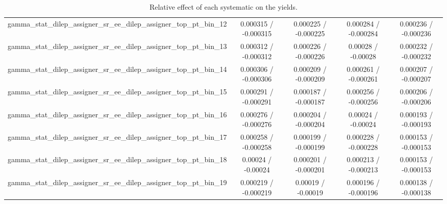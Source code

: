 \documentclass[10pt]{article}
\begin{document}
\begin{table}[htbp]
\begin{center}
\begin{tabular}{|c|c|c|c|c|}
  gamma_stat_dilep_assigner_sr_ee_dilep_assigner_top_pt_bin_12 & 0.000315 / -0.000315 & 0.000225 / -0.000225 & 0.000284 / -0.000284 & 0.000236 / -0.000236 \\ 
  gamma_stat_dilep_assigner_sr_ee_dilep_assigner_top_pt_bin_13 & 0.000312 / -0.000312 & 0.000226 / -0.000226 & 0.00028 / -0.00028 & 0.000232 / -0.000232 \\ 
  gamma_stat_dilep_assigner_sr_ee_dilep_assigner_top_pt_bin_14 & 0.000306 / -0.000306 & 0.000209 / -0.000209 & 0.000261 / -0.000261 & 0.000207 / -0.000207 \\ 
  gamma_stat_dilep_assigner_sr_ee_dilep_assigner_top_pt_bin_15 & 0.000291 / -0.000291 & 0.000187 / -0.000187 & 0.000256 / -0.000256 & 0.000206 / -0.000206 \\ 
  gamma_stat_dilep_assigner_sr_ee_dilep_assigner_top_pt_bin_16 & 0.000276 / -0.000276 & 0.000204 / -0.000204 & 0.00024 / -0.00024 & 0.000193 / -0.000193 \\ 
  gamma_stat_dilep_assigner_sr_ee_dilep_assigner_top_pt_bin_17 & 0.000258 / -0.000258 & 0.000199 / -0.000199 & 0.000228 / -0.000228 & 0.000153 / -0.000153 \\ 
  gamma_stat_dilep_assigner_sr_ee_dilep_assigner_top_pt_bin_18 & 0.00024 / -0.00024 & 0.000201 / -0.000201 & 0.000213 / -0.000213 & 0.000153 / -0.000153 \\ 
  gamma_stat_dilep_assigner_sr_ee_dilep_assigner_top_pt_bin_19 & 0.000219 / -0.000219 & 0.00019 / -0.00019 & 0.000196 / -0.000196 & 0.000138 / -0.000138 \\ 
\hline 
\end{tabular} 
\caption{Relative effect of each systematic on the yields.} 
\end{center} 
\end{table} 
\end{document}
